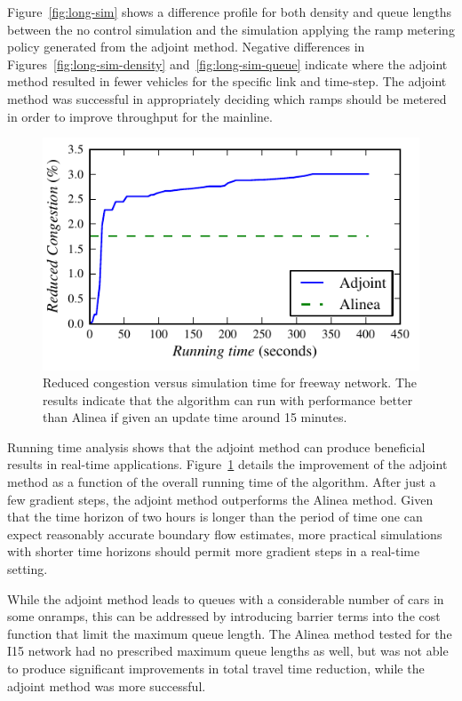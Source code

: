 														
							Figure~\ref{fig:long-sim} shows a difference profile for both density and queue lengths between the
							no control simulation and the simulation applying the ramp metering
							policy generated from the adjoint method. Negative differences in
							Figures~\ref{fig:long-sim-density} and~\ref{fig:long-sim-queue}
							indicate where the adjoint method resulted in fewer vehicles for the
							specific link and time-step. The adjoint method was successful in
							appropriately deciding which ramps should be metered in order to improve
							throughput for the mainline.
							\begin{figure}
								\begin{centering}
									\includegraphics[width=0.65\columnwidth]{images/longsim}
									\par\end{centering}
									\caption{Reduced congestion versus simulation time for freeway network. The results
										indicate that the algorithm can run with performance better than Alinea
										if given an update time around 15 minutes.}\label{fig:running-time}
								\end{figure}
																
																
								Running time analysis shows that the adjoint method can produce beneficial
								results in real-time applications. Figure~\ref{fig:running-time} details the improvement of the adjoint method as a function of the overall running time of the algorithm. After just a few gradient steps, the
								adjoint method outperforms the Alinea method. Given that the time
								horizon of two hours is longer than the period of time one can expect
								reasonably accurate boundary flow estimates, more practical simulations
								with shorter time horizons should permit more gradient steps in a
								real-time setting.
																
								While the adjoint method leads to queues with a considerable number of cars in some onramps, this can be addressed by introducing barrier terms into the cost function that limit the
								maximum queue length. The Alinea method tested for the I15 network
								had no prescribed maximum queue lengths as well, but was not able
								to produce significant improvements in total travel time reduction, while the adjoint method was
								more successful.
																
